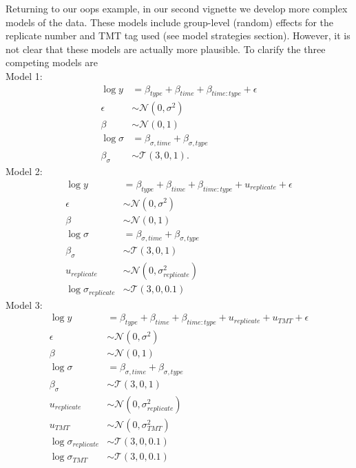 \documentclass[12pt,english, journal=jpr, layout=twocolumn]{article}
\begin{document}
Returning to our oops example, in our second vignette we develop more complex models of the data. These models include group-level (random) effects for the replicate number and TMT tag used (see model strategies section). However, it is not clear that these models are actually more plausible. To clarify the three competing models are
\\
Model 1:
\begin{equation}
	\begin{split}
		\log y &= \beta_{type} + \beta_{time} + \beta_{time:type} + \epsilon\\
		\epsilon &\sim \mathcal{N}(0, \sigma^2)\\
		\beta &\sim \mathcal{N}(0, 1)\\
		\log \sigma &=  \beta_{\sigma, time} + \beta_{\sigma, type} \\
		\beta_{\sigma} &\sim \mathcal{T}(3, 0 , 1).
	\end{split}
\end{equation}
Model 2:
\begin{equation}
	\begin{split}
		\log y &= \beta_{type} + \beta_{time} + \beta_{time:type} + u_{replicate} +  \epsilon\\
		\epsilon &\sim \mathcal{N}(0, \sigma^2)\\
		\beta &\sim \mathcal{N}(0, 1)\\
		\log \sigma &=  \beta_{\sigma, time} + \beta_{\sigma, type}\\
		\beta_{\sigma} &\sim \mathcal{T}(3, 0 , 1)\\
		u_{replicate} &  \sim\mathcal{N}(0, \sigma^2_{replicate})\\
		\log \sigma_{replicate} & \sim \mathcal{T}(3, 0 , 0.1)
	\end{split}
\end{equation}
Model 3:
\begin{equation}
	\begin{split}
		\log y &= \beta_{type} + \beta_{time} + \beta_{time:type} + u_{replicate} + u_{TMT} +  \epsilon\\
		\epsilon &\sim \mathcal{N}(0, \sigma^2)\\
		\beta &\sim \mathcal{N}(0, 1)\\
		\log \sigma &=  \beta_{\sigma, time} + \beta_{\sigma, type}\\
		\beta_{\sigma} &\sim \mathcal{T}(3, 0 , 1)\\
		u_{replicate} & \sim \mathcal{N}(0, \sigma^2_{replicate})\\
		u_{TMT} & \sim \mathcal{N}(0, \sigma^2_{TMT})\\
		\log \sigma_{replicate} &\sim \mathcal{T}(3, 0 , 0.1)\\
		\log \sigma_{TMT} &\sim \mathcal{T}(3, 0 , 0.1)
	\end{split}
\end{equation}
\end{document}
